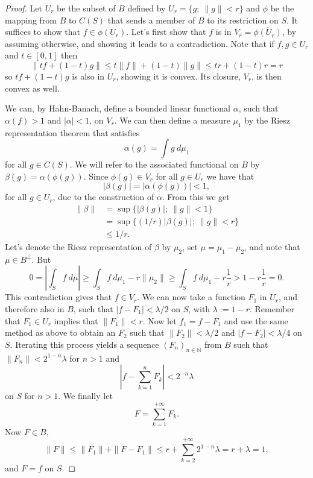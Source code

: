 \documentclass[a4paper,12pt,twoside,BCOR=10mm]{scrbook}
\theoremstyle{definition}
\theoremstyle{definition}
\theoremstyle{definition}
\begin{document}
\begin{proof}
Let $U_r$ be the subset of $B$ defined by $U_r = \{g;\ \|g\| < r\}$ and $\phi$ be the mapping from $B$ to $C(S)$ that sends a member of $B$ to its restriction on $S$.
It suffices to show that $f \in \phi(U_r)$.
Let's first show that $f$ is in $V_r = \overline{\phi(U_r)}$, by assuming otherwise, and showing it leads to a contradiction.
Note that if $f, g \in U_r$ and $t \in [0, 1]$ then
\[
	\|tf + (1 - t)g\| \leq t\|f\| + (1 - t)\|g\| \leq tr + (1 - t)r = r
\]
so $tf + (1 - t)g$ is also in $U_r$, showing it is convex.
Its closure, $V_r$, is then convex as well.

We can, by Hahn-Banach, define a bounded linear functional $\alpha$, such that $\alpha(f) > 1$ and $|\alpha| < 1$, on $V_r$.
We can then define a measure $\mu_1$ by the Riesz representation theorem that satisfies
\[
	\alpha(g) = \int g\ d\mu_1
\]
for all $g \in C(S)$.
We will refer to the associated functional on $B$ by $\beta(g) = \alpha(\phi(g))$.
Since $\phi(g) \in V_r$ for all $g \in U_r$ we have that
\[
	|\beta(g)| = |\alpha(\phi(g))| < 1,
\]
for all $g \in U_r$,
	due to the construction of $\alpha$.
From this we get
\begin{align*}
	\| \beta \|
	&= \sup \{ |\beta(g)|;\ \|g\| < 1 \}\\
	&= \sup \{ (1/r)|\beta(g)|;\ \|g\| < r \}\\
	&\leq 1/r.
\end{align*}
Let's
	denote the Riesz representation of $\beta$ by $\mu_2$,
	set $\mu = \mu_1 - \mu_2$,
	and note that $\mu \in B^{\bot}$.
But
\[
	0 = \left | \int_S f\ d\mu \right | 
		\geq \int_S f\ d\mu_1 - r\|\mu_2\| 
		\geq \int_S f\ d\mu_1 - r\frac{1}{r}
		> 1 - r \frac{1}{r} = 0.
\]
This contradiction gives that $f \in V_r$.
We can now take a function $F_1$ in $U_r$, and therefore also in $B$, such that $|f - F_1| < \lambda/2$ on $S$, with $\lambda := 1 - r$.
Remember that $F_1 \in U_r$ implies that $\|F_1\| < r$.
Now let $f_1 = f - F_1$ and use the same method as above to obtain an $F_2$ such that $\|F_2\| < \lambda/2$ and $|f - F_2| < \lambda/4$ on $S$.
Iterating this process yields a sequence $(F_n)_{n \in \mathbb{N}}$ from $B$ such that $\|F_n\| < 2^{1 - n}\lambda$ for $n > 1$ and
\[
	\left | f - \sum_{k = 1}^n F_k \right | < 2^{-n}\lambda
\]
on $S$ for $n > 1$.
We finally let 
\[
F = \sum_{k = 1}^{+\infty} F_k.
\]
Now $F \in B$,
\[
	\|F\| \leq \|F_1\| + \|F - F_1\| \leq r + \sum_{k = 2}^{+\infty}2^{1 - n}\lambda = r + \lambda = 1,
\]
and $F = f$ on $S$.
\end{proof}
\end{document}
